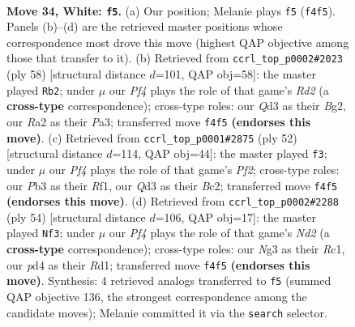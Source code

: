 \documentclass[11pt]{article}
\begin{document}
\clearpage

\begin{figure}[p]\centering
\begin{subfigure}{0.46\textwidth}\centering
\resizebox{\linewidth}{!}{%
\newchessgame
\chessboard[
  setfen={q1b4k/p2n1r1p/1r3b2/2p5/Pp1p1P2/1P1Q2N1/R3P3/1NBK1R2 w - - 14 34},
  showmover=false,
  pgfstyle=straightmove, color=movearrow, markmove={f4-f5}
]}
\caption{}
\end{subfigure}\hfill
\begin{subfigure}{0.46\textwidth}\centering
\resizebox{\linewidth}{!}{%
\newchessgame
\chessboard[
  setfen={4r1k1/1b1r1p2/1q4p1/1Pnp3p/p1pN3P/P1Q1P1P1/3R1PB1/3R2K1 w - - 1 30},
  showmover=false,
  pgfstyle=straightmove, color=movearrow, markmove={d2-b2}
]}
\caption{}
\end{subfigure}
\\[4pt]
\begin{subfigure}{0.46\textwidth}\centering
\resizebox{\linewidth}{!}{%
\newchessgame
\chessboard[
  setfen={2bq1rk1/2r3p1/p1Pp4/P2Ppp2/6n1/1N6/2BQ1PP1/R4RK1 w - - 0 27},
  showmover=false,
  pgfstyle=straightmove, color=movearrow, markmove={f2-f3}
]}
\caption{}
\end{subfigure}\hfill
\begin{subfigure}{0.46\textwidth}\centering
\resizebox{\linewidth}{!}{%
\newchessgame
\chessboard[
  setfen={2r2r2/p5bk/1pnp4/3Qp3/2P1Ppq1/PP6/3N1BP1/2RR2K1 w - - 0 28},
  showmover=false,
  pgfstyle=straightmove, color=movearrow, markmove={d2-f3}
]}
\caption{}
\end{subfigure}
\caption{\textbf{Move 34, White: \texttt{f5}.} (a) Our position; Melanie plays \texttt{f5} (\texttt{f4f5}). Panels (b)--(d) are the retrieved master positions whose correspondence most drove this move (highest QAP objective among those that transfer to it). (b) Retrieved from \texttt{ccrl\_top\_p0002\#2023} (ply 58) [structural distance $d$=101, QAP obj=58]: the master played \texttt{Rb2}; under $\mu$ our \emph{Pf4} plays the role of that game's \emph{Rd2} (a \textbf{cross-type} correspondence); cross-type roles: our \emph{Q}d3 as their \emph{B}g2, our \emph{R}a2 as their \emph{P}a3; transferred move \texttt{f4f5} \textbf{(endorses this move)}. (c) Retrieved from \texttt{ccrl\_top\_p0001\#2875} (ply 52) [structural distance $d$=114, QAP obj=44]: the master played \texttt{f3}; under $\mu$ our \emph{Pf4} plays the role of that game's \emph{Pf2}; cross-type roles: our \emph{P}b3 as their \emph{R}f1, our \emph{Q}d3 as their \emph{B}c2; transferred move \texttt{f4f5} \textbf{(endorses this move)}. (d) Retrieved from \texttt{ccrl\_top\_p0002\#2288} (ply 54) [structural distance $d$=106, QAP obj=17]: the master played \texttt{Nf3}; under $\mu$ our \emph{Pf4} plays the role of that game's \emph{Nd2} (a \textbf{cross-type} correspondence); cross-type roles: our \emph{N}g3 as their \emph{R}c1, our \emph{p}d4 as their \emph{R}d1; transferred move \texttt{f4f5} \textbf{(endorses this move)}. Synthesis: 4 retrieved analogs transferred to \texttt{f5} (summed QAP objective 136, the strongest correspondence among the candidate moves); Melanie committed it via the \texttt{search} selector.}
\label{fig:thought-m66}
\end{figure}
\end{document}

